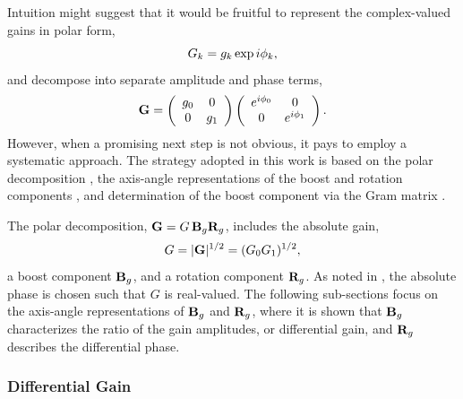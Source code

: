 Intuition might suggest that it would be fruitful to 
represent the complex-valued gains in polar form, $$G_k = g_k \exp i \phi_k,$$ and decompose  into separate amplitude and phase terms,
%
\begin{equation}
\label{eqn:intuitive_receiver_gains}
    {\bf G} =
    \left( \begin{array}{cc}
		g_0 & 0 \\
		0   & g_1
	\end{array} \right)
    \left( \begin{array}{cc}
    e^{i\phi_0} & 0 \\
    0   & e^{i\phi_1}
\end{array} \right).
\end{equation}
%
However, when a promising next step is not obvious, 
it pays to employ a systematic approach.  The strategy adopted 
in this work is based on the polar decomposition , the axis-angle representations of the boost and rotation components ,
and determination of the boost component via the Gram matrix .

The polar decomposition,
${\bf G}=G \, {\bf B}_g {\bf R}_g$, includes the absolute gain,
%
\begin{equation}
\label{eqn:absolute_gain}
G = |{\bf G}|^{1/2} = (G_0 G_1)^{1/2},
\end{equation}
%
a boost component ${\bf B}_g$, and a rotation component ${\bf R}_g$.
%
As noted in , the absolute phase is chosen such that $G$ is real-valued.
%
The following sub-sections focus on the axis-angle representations of ${\bf B}_g$ and ${\bf R}_g$,
where it is shown that ${\bf B}_g$ characterizes the
ratio of the gain amplitudes, or differential gain, and
${\bf R}_g$ describes the differential phase.


\subsubsection{Differential Gain}
\label{sec:differential_gain}

